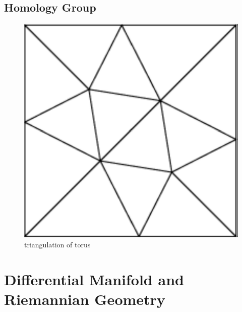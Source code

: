 \documentclass[12pt,a4paper]{book}
\theoremstyle{definition}
\begin{document}
\section{Homology Group}
\begin{figure}[H]
    \includegraphics[scale=0.3]{tri-S^1_S^1.png}
    \centering
    \caption{triangulation of torus}
\end{figure}

\chapter{Differential Manifold and Riemannian Geometry}
\end{document}
